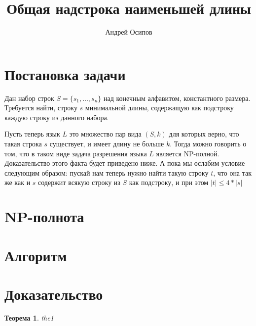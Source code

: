 \documentclass[a4paper,12pt]{article}
\title{Общая надстрока наименьшей длины}
\author{Андрей Осипов}
\newtheorem{theorem}{Теорема}
\begin{document}
\Russian
\maketitle

\section{Постановка задачи}
Дан набор строк $S = \{s_1,\dots,s_n\}$ над конечным алфавитом, константного размера. 
Требуется найти, строку $s$ минимальной длины, содержащую как подстроку каждую строку из данного набора.
% 

Пусть теперь язык $L$ это множество пар вида $(S, k)$ для которых верно, что такая строка $s$ существует, и имеет длину не больше $k$.
Тогда можно говорить о том, что в таком виде задача разрешения языка $L$ является NP-полной.
Доказательство этого факта будет приведено ниже.
А пока мы ослабим условие следующим образом: пускай нам теперь нужно найти такую строку $t$, 
что она так же как и $s$ содержит всякую строку из $S$ как подстроку, и при этом $|t| \leq 4*|s|$

\section{NP-полнота}

\section{Алгоритм}

\section{Доказательство}

\begin{theorem}
the1
\end{theorem}
\end{document}

